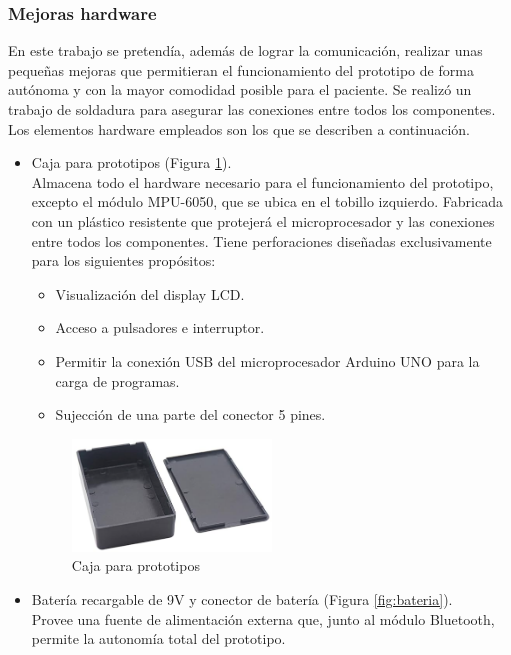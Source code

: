 \subsubsection{Mejoras hardware}
En este trabajo se pretendía, además de lograr la comunicación, realizar unas pequeñas mejoras que permitieran el funcionamiento del prototipo de forma autónoma y con la mayor comodidad posible para el paciente. Se realizó un trabajo de soldadura para asegurar las conexiones entre todos los componentes. Los elementos hardware empleados son los que se describen a continuación.
\begin{itemize}
    \item Caja para prototipos (Figura \ref{fig:cajaPrototipos}). \\
    Almacena todo el hardware necesario para el funcionamiento del prototipo, excepto el módulo MPU-6050, que se ubica en el tobillo izquierdo. Fabricada con un plástico resistente que protejerá el microprocesador y las conexiones entre todos los componentes. Tiene perforaciones diseñadas exclusivamente para los siguientes propósitos:
    \begin{itemize}
        \item Visualización del display LCD.
        \item Acceso a pulsadores e interruptor.
        \item Permitir la conexión USB del microprocesador Arduino UNO para la carga de programas.
        \item Sujección de una parte del conector 5 pines.
    \end{itemize}

    \begin{figure}[h]
        \centering
        \includegraphics[width=0.5\textwidth]{img/4.TecnicasHerramientas/CajaPrototipos.png}
        \caption{Caja para prototipos \cite{CajaProt627:online}}
        \label{fig:cajaPrototipos}
    \end{figure}
    
    \item Batería recargable de 9V y conector de batería (Figura \ref{fig:bateria}).\\
    Provee una fuente de alimentación externa que, junto al módulo Bluetooth, permite la autonomía total del prototipo.


\end{itemize}
